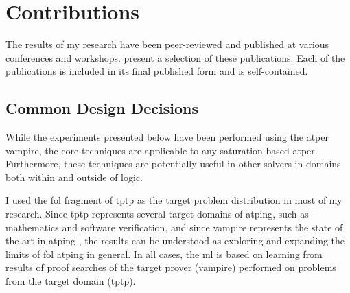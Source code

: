 
\section{Contributions}
\label{sec:contributions}



The results of my research have been peer-reviewed and published at various conferences and workshops.
present a selection of these publications.
Each of the publications is included in its final published form and is self-contained.

\subsection{Common Design Decisions}

While the experiments presented below have been performed using the \gls{atper} \gls{vampire},
the core techniques are applicable to any \gls{saturation}-based \gls{atper}.
Furthermore, these techniques are potentially useful in other solvers in domains both within and outside of logic.

I used the \gls{fol} fragment of \gls{tptp} as the target problem distribution in most of my research.
Since \gls{tptp} represents several target domains of \gls{atping},
such as mathematics and software verification,
and since \gls{vampire} represents the state of the art in \gls{atping} \cite{casc-j12,DBLP:journals/aicom/SutcliffeD23},
the results can be understood as exploring and expanding the limits of \gls{fol} \gls{atping} in general.
In all cases, the \gls{ml} is based on learning from results of proof searches of the target prover (\gls{vampire}) performed on problems from the target domain (\gls{tptp}).

